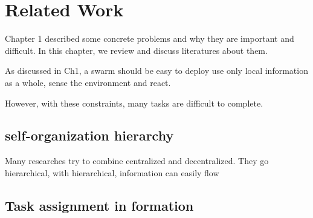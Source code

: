 \chapter{Related Work}
\label{ch2}












Chapter 1 described some concrete problems and why they are important and difficult.
In this chapter, we review and discuss literatures about them.

As discussed in Ch1, a swarm should be
    easy to deploy
    use only local information
    as a whole, sense the environment and react.

However, with these constraints, many tasks are difficult to complete.

\section{self-organization hierarchy}

Many researches try to combine centralized and decentralized.
They go hierarchical, with hierarchical, information can easily flow

\section{Task assignment in formation}

